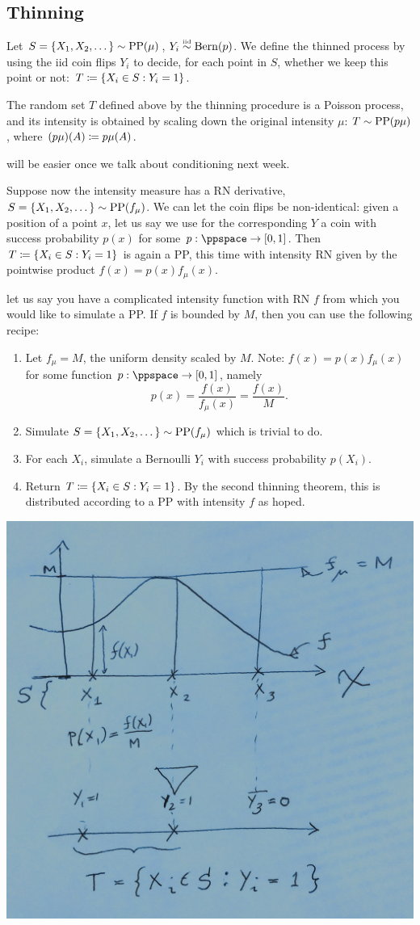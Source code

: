 \documentclass{article}
\begin{document}
\subsection{Thinning}

 Let $S = \{X_1, X_2, \dots\} \sim \operatorname{PP}(\mu)$, $Y_i \stackrel{\scriptscriptstyle \textrm{iid}}{\sim} \operatorname{Bern}(p)$. We define the thinned process by using the iid coin flips $Y_i$ to decide, for each point in $S$, whether we keep this point or not: $T \coloneqq \{X_i \in S : Y_i = 1\}$.

 The random set $T$ defined above by the thinning procedure is a Poisson process, and its intensity is obtained by scaling down the original intensity $\mu$: $T \sim \operatorname{PP}(p\mu)$, where $(p\mu)(A) \coloneqq p \mu(A)$.

 will be easier once we talk about conditioning next week. 

 Suppose now the intensity measure has a RN derivative, $S = \{X_1, X_2, \dots\} \sim \operatorname{PP}(f_\mu)$. We can let the coin flips be non-identical: given a position of a point $x$, let us say we use for the corresponding $Y$ a coin with success probability $p(x)$ for some $p : \ppspace \to [0, 1]$. Then $T \coloneqq \{X_i \in S : Y_i = 1\}$ is again a PP, this time with intensity RN given by the pointwise product $f(x) = p(x) f_\mu(x)$.

 let us say you have a complicated intensity function with RN $f$ from which you would like to simulate a PP. If $f$ is bounded by $M$, then you can use the following recipe:
\begin{enumerate}
	\item Let $f_\mu = M$, the uniform density scaled by $M$. Note: $f(x) = p(x) f_\mu(x)$ for some function $p : \ppspace \to [0, 1]$, namely
	\[ p(x) =  \frac{f(x)}{f_\mu(x)} = \frac{f(x)}{M}. \] 
	\item Simulate $S = \{X_1, X_2, \dots\} \sim \operatorname{PP}(f_\mu)$ which is trivial to do.
	\item For each $X_i$, simulate a Bernoulli $Y_i$ with success probability $p(X_i)$.
	\item Return $T \coloneqq \{X_i \in S : Y_i = 1\}$. By the second thinning theorem, this is distributed according to a PP with intensity $f$ as hoped.
\end{enumerate}
\begin{center}
	\includegraphics[width=0.6\linewidth]{figures/thinning} 
\end{center}
\end{document}
